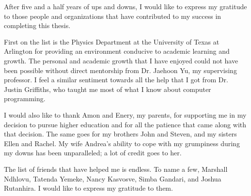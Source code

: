 \par After five and a half years of ups and downs, I would like to express my 
gratitude to those people and organizations that have contributed to my 
success in completing this thesis. 

\par First on the list is the Physics Department at the University of 
Texas at Arlington for providing an environment conducive to academic learning and 
growth. The personal and academic growth that I have enjoyed could not have been 
possible without direct mentorship from Dr. Jaehoon Yu, my supervising professor. 
I feel a similar sentiment towards all the help that I got from Dr. Justin Griffiths, 
who taught me most of what I know about computer programming.  

\par I would also like to thank Amon and Enery, my parents, for supporting me in 
my decision to pursue higher education and for all the patience that came along with 
that decision. The same goes for my brothers John and Steven, and my sisters Ellen and 
Rachel. My wife Andrea's ability to cope with my grumpiness during my downs has 
been unparalleled; a lot of credit goes to her.

\par The list of friends that have helped me is endless. To name a few, Marshall Ndhlovu, 
Tatenda Yemeke, Nancy Kasvosve, Simba Gandari, and Joshua Rutanhira. I would like to express my gratitude 
to them.  

